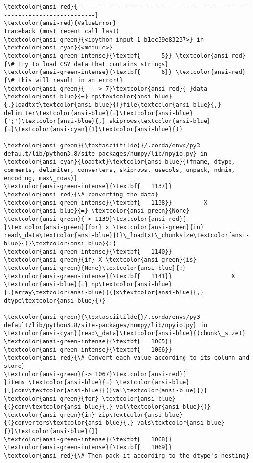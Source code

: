 \documentclass[10pt]{scrartcl}
\begin{document}
    \begin{Verbatim}[commandchars=\\\{\}, frame=single, framerule=2mm, rulecolor=\color{outerrorbackground}]
\textcolor{ansi-red}{---------------------------------------------------------------------------}
\textcolor{ansi-red}{ValueError}                                Traceback (most recent call last)
\textcolor{ansi-green}{<ipython-input-1-b1ec39e83237>} in \textcolor{ansi-cyan}{<module>}
\textcolor{ansi-green-intense}{\textbf{      5}} \textcolor{ansi-red}{\# Try to load CSV data that contains strings}
\textcolor{ansi-green-intense}{\textbf{      6}} \textcolor{ansi-red}{\# This will result in an error!}
\textcolor{ansi-green}{----> 7}\textcolor{ansi-red}{ }data \textcolor{ansi-blue}{=} np\textcolor{ansi-blue}{.}loadtxt\textcolor{ansi-blue}{(}file\textcolor{ansi-blue}{,} delimiter\textcolor{ansi-blue}{=}\textcolor{ansi-blue}{';'}\textcolor{ansi-blue}{,} skiprows\textcolor{ansi-blue}{=}\textcolor{ansi-cyan}{1}\textcolor{ansi-blue}{)}

\textcolor{ansi-green}{\textasciitilde{}/.conda/envs/py3-default/lib/python3.8/site-packages/numpy/lib/npyio.py} in \textcolor{ansi-cyan}{loadtxt}\textcolor{ansi-blue}{(fname, dtype, comments, delimiter, converters, skiprows, usecols, unpack, ndmin, encoding, max\_rows)}
\textcolor{ansi-green-intense}{\textbf{   1137}}         \textcolor{ansi-red}{\# converting the data}
\textcolor{ansi-green-intense}{\textbf{   1138}}         X \textcolor{ansi-blue}{=} \textcolor{ansi-green}{None}
\textcolor{ansi-green}{-> 1139}\textcolor{ansi-red}{         }\textcolor{ansi-green}{for} x \textcolor{ansi-green}{in} read\_data\textcolor{ansi-blue}{(}\_loadtxt\_chunksize\textcolor{ansi-blue}{)}\textcolor{ansi-blue}{:}
\textcolor{ansi-green-intense}{\textbf{   1140}}             \textcolor{ansi-green}{if} X \textcolor{ansi-green}{is} \textcolor{ansi-green}{None}\textcolor{ansi-blue}{:}
\textcolor{ansi-green-intense}{\textbf{   1141}}                 X \textcolor{ansi-blue}{=} np\textcolor{ansi-blue}{.}array\textcolor{ansi-blue}{(}x\textcolor{ansi-blue}{,} dtype\textcolor{ansi-blue}{)}

\textcolor{ansi-green}{\textasciitilde{}/.conda/envs/py3-default/lib/python3.8/site-packages/numpy/lib/npyio.py} in \textcolor{ansi-cyan}{read\_data}\textcolor{ansi-blue}{(chunk\_size)}
\textcolor{ansi-green-intense}{\textbf{   1065}} 
\textcolor{ansi-green-intense}{\textbf{   1066}}             \textcolor{ansi-red}{\# Convert each value according to its column and store}
\textcolor{ansi-green}{-> 1067}\textcolor{ansi-red}{             }items \textcolor{ansi-blue}{=} \textcolor{ansi-blue}{[}conv\textcolor{ansi-blue}{(}val\textcolor{ansi-blue}{)} \textcolor{ansi-green}{for} \textcolor{ansi-blue}{(}conv\textcolor{ansi-blue}{,} val\textcolor{ansi-blue}{)} \textcolor{ansi-green}{in} zip\textcolor{ansi-blue}{(}converters\textcolor{ansi-blue}{,} vals\textcolor{ansi-blue}{)}\textcolor{ansi-blue}{]}
\textcolor{ansi-green-intense}{\textbf{   1068}} 
\textcolor{ansi-green-intense}{\textbf{   1069}}             \textcolor{ansi-red}{\# Then pack it according to the dtype's nesting}


\end{Verbatim}
\end{document}
